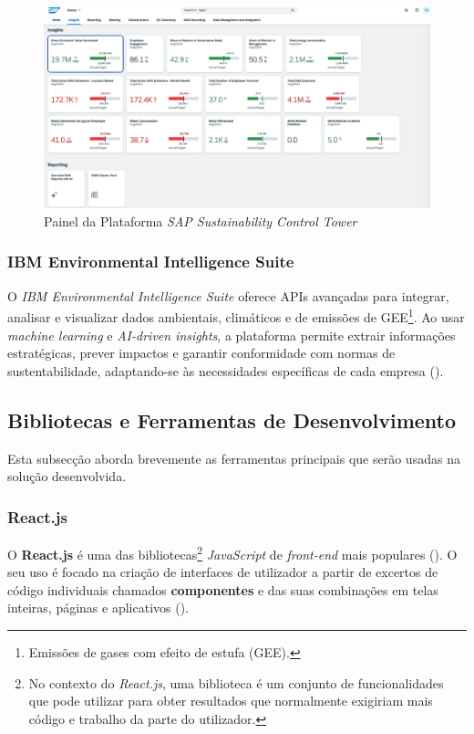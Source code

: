 \begin{figure}[h]
    \centering
    \includegraphics[width=\linewidth]{frontmatter/assets/SAP.png}
    \caption{Painel da Plataforma \textit{SAP Sustainability Control Tower}}
    \label{fig:sap_sustainability_control_tower}
\end{figure}

\subsubsection{IBM Environmental Intelligence Suite}

O \textit{IBM Environmental Intelligence Suite} oferece APIs avançadas para integrar, analisar e visualizar dados ambientais, climáticos e de emissões de GEE\footnote{Emissões de gases com efeito de estufa (GEE).}. Ao usar \textit{machine learning} e \textit{AI-driven insights}, a plataforma permite extrair informações estratégicas, prever impactos e garantir conformidade com normas de sustentabilidade, adaptando-se às necessidades específicas de cada empresa (\cite{IBM2025}).

\subsection{Bibliotecas e Ferramentas de Desenvolvimento}
\label{subsec: BFD}

Esta subsecção aborda brevemente as ferramentas principais que serão usadas na solução desenvolvida.

\subsubsection{React.js}

O \textbf{React.js} é uma das bibliotecas\footnote{No contexto do \textit{React.js}, uma biblioteca é um conjunto de funcionalidades que pode utilizar para obter resultados que normalmente exigiriam mais código e trabalho da parte do utilizador.} \textit{JavaScript} de \textit{front-end} mais populares (\cite{Schwarzmuller2022}). O seu uso é focado na criação de interfaces de utilizador a partir de excertos de código individuais chamados \textbf{componentes} e das suas combinações em telas inteiras, páginas e aplicativos (\cite{React2025}).

